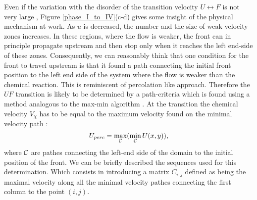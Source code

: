 \documentclass[doublecol]{epl2}
\begin{document}
Even if the variation with the disorder of the transition velocity $U\leftrightarrow F$ is not very large ,
Figure \ref{phase_I_to_IV}(c-d) gives some insight of the physical mechanism at work. As $u$ is decreased, the number and the size of weak velocity zones increases. In these regions, where the flow is weaker, the front can in principle propagate upstream and then stop only when it reaches the left end-side of these zones. Consequently, we can reasonably think that one condition for the front to travel upstream is that it found a path connecting the initial front position to the left end side of the system where the flow is weaker than the chemical reaction. This is reminiscent of percolation like approach. Therefore the  $UF$ transition is likely to be determined by a path-criteria which is found using  a method analogous to the max-min algorithm \cite{hansen87}. At the transition the chemical velocity $V_{\chi }$ has to be equal to the maximum velocity found on the minimal velocity path :
$$U_{perc} = \max_{\cal C} (\min_{\cal C} U(x,y)),$$
 where $\cal C$ are pathes connecting the left-end side of the domain to the initial position of the front.
We can be briefly described the sequences used for this determination. Which consists in introducing a matrix $C_{i,j}$ defined as being the maximal velocity along all the minimal velocity pathes connecting the first column to the point $(i,j)$.
\end{document}
